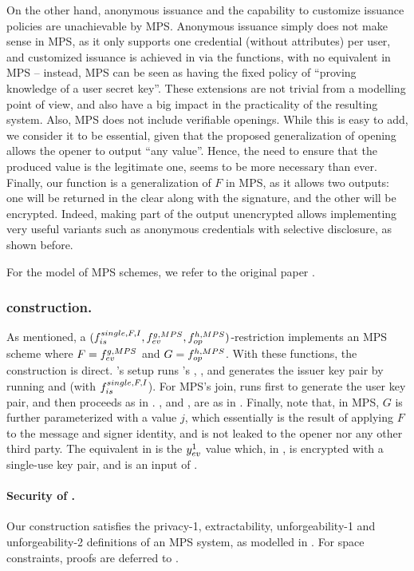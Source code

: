 On the other hand, anonymous issuance and the capability to customize issuance
policies are unachievable by MPS. Anonymous issuance simply does not make sense
in MPS, as it only supports one credential (without attributes) per user, and
customized issuance is achieved in \UAS via the \fissue functions, with no
equivalent in MPS -- instead, MPS can be seen as having the fixed policy of
``proving knowledge of a user secret key''. These extensions are not trivial
from a modelling point of view, and also have a big impact in the practicality
of the resulting system. Also, MPS does not include verifiable openings. While
this is easy to add, we consider it to be essential, given that the proposed
generalization of opening allows the opener to output ``any value''. Hence, the
need to ensure that the produced value is the legitimate one, seems to be more
necessary than ever. Finally, our \feval function is a generalization of $F$ in
MPS, as it allows two outputs: one will be returned in the clear along with the
signature, and the other will be encrypted. Indeed, making part of the output
unencrypted allows implementing very useful variants such as anonymous
credentials with selective disclosure, as shown before.

For the model of MPS schemes, we refer to the original paper \cite{ngsy22}.

\subsubsection{\CUASMPS construction.} %
As mentioned, a $(f_{is}^{single,F,I},f_{ev}^{g,MPS},
f_{op}^{h,MPS})$-restriction implements an MPS scheme where $F=f_{ev}^{g,MPS}$
and $G=f_{op}^{h,MPS}$. With these functions, the construction is direct.
\CUASMPS's setup runs \CUASGen's \Setup, \OKeyGen, and generates the issuer key
pair by running \KeyGen and \ISet (with $f_{is}^{single,F,I}$). For MPS's join,
\CUASMPS runs first \KeyGen to generate the user key pair, and then proceeds as
in \CUASGen. \Sign, \Verify and \Open, are as in \CUASGen.
%
Finally, note that, in MPS, $G$ is further parameterized with a value $j$, which
essentially is the result of applying $F$ to the message and signer identity,
and is not leaked to the opener nor any other third party. The equivalent in
\UAS is the $y_{ev}^1$ value which, in \CUASGen, is encrypted with a single-use
key pair, and is an input of \finsp.

\paragraph{Security of \CUASMPS.} %
Our \CUASMPS construction satisfies the privacy-1, extractability,
unforgeability-1 and unforgeability-2 definitions of an MPS system, as modelled
in \cite{ngsy22}. For space constraints, proofs are deferred to
.

